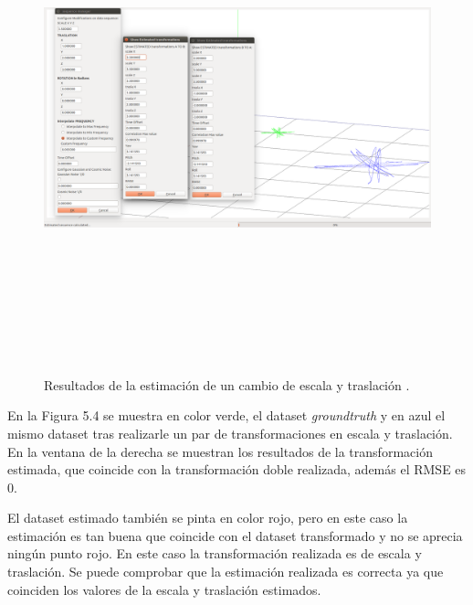 \begin{figure}[H]
\begin{center}
\label{fig:traslaEscalaTest}\includegraphics[height=14.0cm,width=18.0cm]{img/cap6/Escala_Traslacion_abba.png}
\hspace{0.5cm}

\end{center}

\caption{Resultados de la estimación de un cambio de escala y traslación .}
\end{figure}

En la Figura 5.4 se muestra en color verde, el dataset \textit{groundtruth} y en azul el mismo dataset tras realizarle un par de transformaciones en escala y traslación.
En la ventana de la derecha se muestran los resultados de la transformación estimada, que coincide con la transformación doble realizada, además el RMSE es 0.

El dataset estimado también se pinta en color rojo, pero en este caso la estimación es tan buena que coincide con el dataset transformado y no se aprecia ningún punto rojo.
En este caso la transformación realizada es de escala y traslación. Se puede comprobar que la estimación realizada es correcta ya que coinciden los valores de la escala y traslación estimados.

